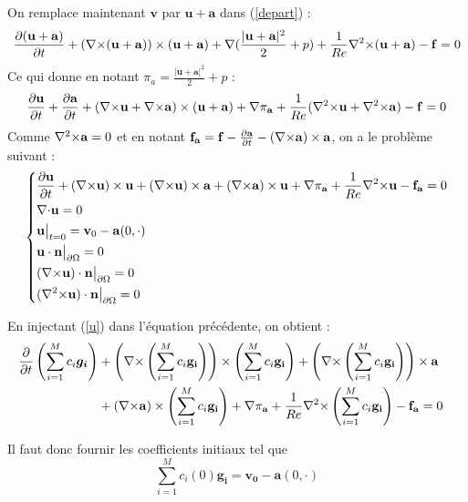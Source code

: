 On remplace maintenant $\mathbf{v}$ par $\mathbf{u}+\mathbf{a}$ dans (\ref{depart}) :
\[ \frac{\partial(\mathbf{u}+\mathbf{a})}{\partial t}+({\nabla\times}(\mathbf{u}+\mathbf{a}))\times(\mathbf{u}+\mathbf{a}) + {\nabla} (\frac{|\mathbf{u}+\mathbf{a}|^2}{2}+p) + \frac{1}{Re}{\nabla^2\times}(\mathbf{u}+\mathbf{a}) - \mathbf{f} = 0 \]
Ce qui donne en notant $\pi_a=\frac{|\mathbf{u}+\mathbf{a}|^2}{2}+p$ :
\[ \frac{\partial \mathbf{u}}{\partial t}+\frac{\partial \mathbf{a}}{\partial t} + ({\nabla\times} \mathbf{u}+{\nabla\times} \mathbf{a})\times(\mathbf{u}+\mathbf{a}) + {\nabla}\pi_{\mathbf{a}} + \frac{1}{Re}({\nabla^2\times} \mathbf{u}+{\nabla^2\times} \mathbf{a}) - \mathbf{f} = 0 \]
Comme ${\nabla^2\times} \mathbf{a} = 0$ et en notant $\mathbf{f_a}=\mathbf{f}-\frac{\partial \mathbf{a}}{\partial t} - ({\nabla\times} \mathbf{a})\times \mathbf{a}$, on a le problème suivant :
\begin{equation}\label{pbu}
\left\{\begin{aligned}
&\frac{\partial \mathbf{u}}{\partial t} + ({\nabla\times} \mathbf{u})\times \mathbf{u} + ({\nabla\times} \mathbf{u})\times \mathbf{a} +({\nabla\times} \mathbf{a})\times \mathbf{u} + {\nabla} \pi_{\mathbf{a}} +\frac{1}{Re}{\nabla^2\times}  \mathbf{u} - \mathbf{f_a} = 0\\
&{\nabla\cdot} \mathbf{u} = 0\\
&\mathbf{u}\big\rvert_{t=0} = \mathbf{v}_0 - \mathbf{a}(0,\cdot)\\
&\mathbf{u}\cdot \mathbf{n}{\big\rvert_{\partial\Omega}} = 0\\
&({\nabla\times} \mathbf{u})\cdot \mathbf{n}{\big\rvert_{\partial\Omega}} = 0\\
&({\nabla^2\times}  \mathbf{u})\cdot \mathbf{n}{\big\rvert_{\partial\Omega}} = 0
\end{aligned}\right.
\end{equation}

En injectant (\ref{u}) dans l'équation précédente, on obtient :
\begin{equation}\label{pbc}
\begin{aligned}
\frac{\partial}{\partial t}\left(\sum_{i=1}^M c_i\bm{g_i}\right) &+ \left({\nabla\times} \left(\sum_{i=1}^Mc_i\mathbf{g_i}\right)\right)\times \left(\sum_{i=1}^Mc_i\mathbf{g_i}\right) + \left({\nabla\times} \left(\sum_{i=1}^Mc_i\mathbf{g_i}\right)\right)\times \mathbf{a}&\\
&+ ({\nabla\times} \mathbf{a})\times \left(\sum_{i=1}^Mc_i\mathbf{g_i}\right) + {\nabla} \pi_{\mathbf{a}} +\frac{1}{Re}{\nabla^2\times}  \left(\sum_{i=1}^Mc_i\mathbf{g_i}\right) - \mathbf{f_a} =0\\
\end{aligned}\end{equation} 

Il faut donc fournir les coefficients initiaux tel que 
\[ \sum_{i=1}^M c_i(0)\bm{g_i} = \bm{v_0}-\bm{a}(0,\cdot) \]

